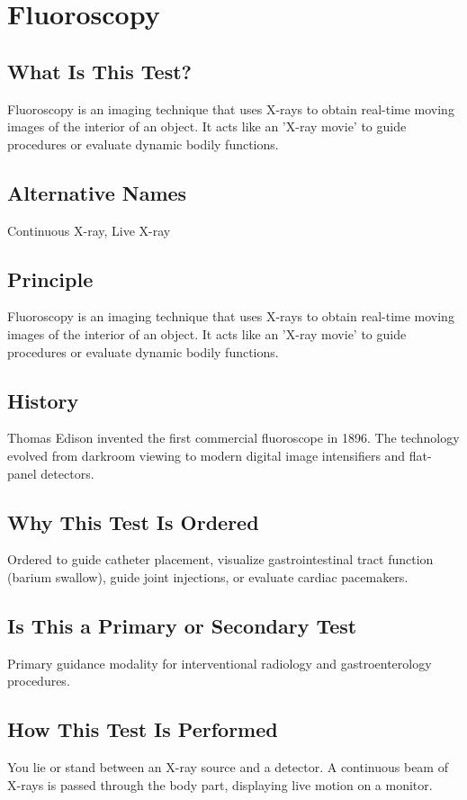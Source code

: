\chapter{Fluoroscopy}

\section*{What Is This Test?}
Fluoroscopy is an imaging technique that uses X-rays to obtain real-time moving images of the interior of an object. It acts like an 'X-ray movie' to guide procedures or evaluate dynamic bodily functions.

\section*{Alternative Names}
Continuous X-ray, Live X-ray

\section*{Principle}
Fluoroscopy is an imaging technique that uses X-rays to obtain real-time moving images of the interior of an object. It acts like an 'X-ray movie' to guide procedures or evaluate dynamic bodily functions.

\section*{History}
Thomas Edison invented the first commercial fluoroscope in 1896. The technology evolved from darkroom viewing to modern digital image intensifiers and flat-panel detectors.

\section*{Why This Test Is Ordered}
Ordered to guide catheter placement, visualize gastrointestinal tract function (barium swallow), guide joint injections, or evaluate cardiac pacemakers.

\section*{Is This a Primary or Secondary Test}
Primary guidance modality for interventional radiology and gastroenterology procedures.

\section*{How This Test Is Performed}
You lie or stand between an X-ray source and a detector. A continuous beam of X-rays is passed through the body part, displaying live motion on a monitor.

